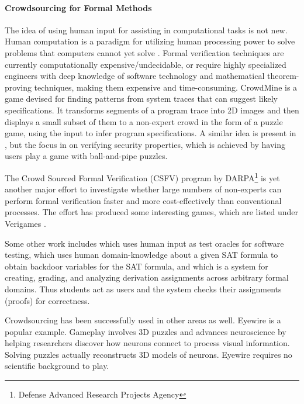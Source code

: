 \paragraph{Crowdsourcing for Formal Methods}
The idea of using human input for assisting in computational tasks is not new. Human computation is a paradigm for utilizing human processing power to solve problems that computers cannot yet solve \cite{vonahn2005, quinn2011}. Formal verification techniques are currently computationally expensive/undecidable, or require highly specialized engineers with deep knowledge of software technology and mathematical theorem-proving techniques, making them expensive and time-consuming. CrowdMine \cite{wenchao2012} is a game devised for finding patterns from system traces that can suggest likely specifications. It transforms segments of a program trace into 2D images and then displays a small subset of them to a non-expert crowd in the form of a puzzle game, using the input to infer program specifications. A similar idea is present in \cite{ernst2012}, but the focus in on verifying security properties, which is achieved by having users play a game with ball-and-pipe puzzles.

The Crowd Sourced Formal Verification (CSFV) program by DARPA\footnote{Defense Advanced Research Projects Agency} is yet another major effort to investigate whether large numbers of non-experts can perform formal verification faster and more cost-effectively than conventional processes. The effort has produced some interesting games, which are listed under Verigames \cite{verigames}.

Some other work includes \cite{pastore2013} which uses human input as test oracles for software testing, \cite{lebras2013} which uses human domain-knowledge about a given SAT formula to obtain backdoor variables for the SAT formula, and \cite{fast2013} which is a system for creating, grading, and analyzing derivation assignments across arbitrary formal
domains. Thus students act as users and the system checks their assignments (proofs) for correctness.

Crowdsourcing has been successfully used in other areas as well. Eyewire \cite{eyewire} is a popular example. Gameplay involves 3D puzzles and advances neuroscience by helping researchers discover how neurons connect to process visual information. Solving puzzles actually reconstructs 3D models of neurons. Eyewire requires no scientific background to play.


